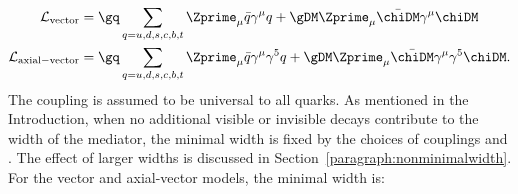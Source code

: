 \begin{align}
\label{eq:AV} 
\mathcal{L}_{\mathrm{vector}} &= \gq \sum_{q={u,d,s,c,b,t}}  \Zprime_{\mu} \bar{q}\gamma^{\mu}q + \gDM \Zprime_{\mu} \bar{\chiDM}\gamma^{\mu}\chiDM \\
\mathcal{L}_{\rm{axial-vector}} &= \gq \sum_{q={u,d,s,c,b,t}}  \Zprime_{\mu} \bar{q}\gamma^{\mu}\gamma^5q + \gDM \Zprime_{\mu} \bar{\chiDM}\gamma^{\mu}\gamma^5\chiDM.
\end{align}
The coupling \gq is assumed to be universal to all quarks.
As mentioned in the Introduction, when no additional visible or invisible decays contribute to the width of the mediator, 
the minimal width is fixed by the choices of couplings \gq and \gDM. The effect of larger 
widths is discussed in Section~\ref{paragraph:nonminimalwidth}. 
For the vector and axial-vector models, the minimal width is:

